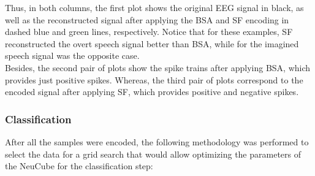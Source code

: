 Thus, in both columns, the first plot shows the original EEG signal in black, as well as the reconstructed signal after applying the BSA and SF encoding in dashed blue and green lines, respectively. Notice that for these examples, SF reconstructed the overt speech signal better than BSA, while for the imagined speech signal was the opposite case.\\

Besides, the second pair of plots show the spike trains after applying BSA, which provides just positive spikes. Whereas, the third pair of plots correspond to the encoded signal after applying SF, which provides positive and negative spikes.\\

\subsubsection{Classification}
After all the samples were encoded, the following methodology was performed to select the data for a grid search that would allow optimizing the parameters of the NeuCube for the classification step:\\
